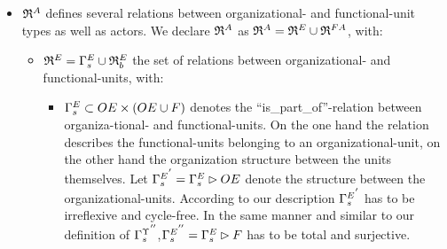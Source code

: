 \begin{itemize}
\begin{itemize}
		\item As explained above, there is the need for a flexible integration of new relation-types into the model. Therefore we define a set of relation-types $\typbenutzerrelationenmenge$. Every relationship $\typbenutzerrelation \in R^{\typsymbol}$ has the structure $\typbenutzerrelation \subset (\ftyp \times \ftyp) \times \praedikat$ and can further be constraint using predicates to restrict the set of valid functional-unit types and therefore the set of valid users\footnote{Please take a look at the relation $\relstrukturFA$ and its according constraints}. Please note that $\typbenutzerrelation$ is used as variable. The relations between the functional-unit types, that can expressed using the term $dom(\typbenutzerrelation)$, are irreflexive. Defining a deputyship between one node and itself is not very meaningful for instance. Concerning the predicates we additionally postulate that each $\typbenutzerrelation \in \typbenutzerrelationenmenge$ has to be a function, assigning each ordered pair $(f,f) \in \ftyp \times \ftyp$ a unique predicate $p \in \praedikat$.

	\end{itemize}
	\item ${\mathfrak{R}}^{A}$ defines several relations between organizational- and functional-unit types as well as actors. We declare ${\mathfrak{R}}^{A}$ as 		$\relmengeinst = \relmengeinstOE_F \cup \relmengeinstFA$, with:

		\begin{itemize}

		\item $\relmengeinstOE_F = \relstrukturOE_F \cup \relmengebenutzerinstOE_F$ the set of relations between organizational- and functional-units, with:
			\begin{itemize}
			\item $\relstrukturOE_F \subset \oe \times (\oe \cup \f)$ denotes the ``is\_part\_of''-relation between organiza-tional- and functional-units. On the one hand the relation describes the functional-units belonging to an organizational-unit, on the other hand the organization structure between the units themselves. Let ${\relstrukturOE_F}^{'} = \relstrukturOE_F \rhd \oe$ denote the structure between the organizational-units. According to our description ${\relstrukturOE_F}^{'}$ has to be irreflexive and cycle-free. In the same manner and similar to our definition of ${{\Gamma}^{\Upsilon}_{s}}^{''}$,${\relstrukturOE_F}^{''} = \relstrukturOE_F \rhd \f$ has to be total and surjective.


\end{itemize}
\end{itemize}
\end{itemize}
